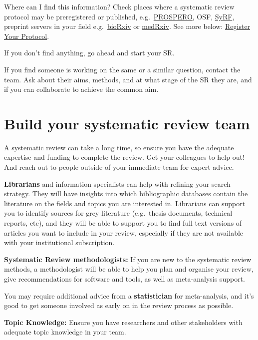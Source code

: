 \documentclass[
]{book}
\begin{document}
Where can I find this information?
Check places where a systematic review protocol may be preregistered or published, e.g.~\href{https://www.crd.york.ac.uk/prospero/}{PROSPERO}, OSF, \href{https://syrf.org.uk/}{SyRF}, preprint servers in your field e.g.~\href{https://www.biorxiv.org/}{bioRxiv} or \href{https://www.medrxiv.org/}{medRxiv}. See more below: \href{www.camarades.de/protocol.html\#register-your-protocol}{Register Your Protocol}.

If you don't find anything, go ahead and start your SR.

If you find someone is working on the same or a similar question, contact the team. Ask about their aims, methods, and at what stage of the SR they are, and if you can collaborate to achieve the common aim.

\hypertarget{build-your-systematic-review-team}{%
\section{Build your systematic review team}\label{build-your-systematic-review-team}}

A systematic review can take a long time, so ensure you have the adequate expertise and funding to complete the review. Get your colleagues to help out! And reach out to people outside of your immediate team for expert advice.

\textbf{Librarians} and information specialists can help with refining your search strategy. They will have insights into which bibliographic databases contain the literature on the fields and topics you are interested in. Librarians can support you to identify sources for grey literature (e.g.~thesis documents, technical reports, etc), and they will be able to support you to find full text versions of articles you want to include in your review, especially if they are not available with your institutional subscription.

\textbf{Systematic Review methodologists:}
If you are new to the systematic review methods, a methodologist will be able to help you plan and organise your review, give recommendations for software and tools, as well as meta-analysis support.

You may require additional advice from a \textbf{statistician} for meta-analysis, and it's good to get someone involved as early on in the review process as possible.

\textbf{Topic Knowledge: }
Ensure you have researchers and other stakeholders with adequate topic knowledge in your team.
\end{document}
